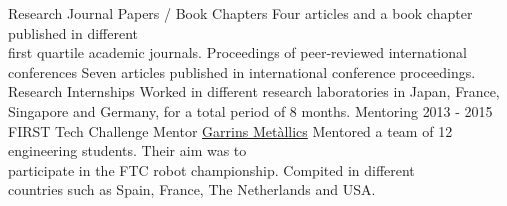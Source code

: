 \documentclass[letterpaper]{DS_class_file} %
\begin{document}
    \begin{twenty} %
        \twentyitem
        {Research}
        {}
        {Journal Papers / Book Chapters}
        {}
        {Four articles and a book chapter published in different \\ first quartile academic journals.}
        {}
        \twentyitem
        {}
        {}
        {Proceedings of peer-reviewed international conferences}
        {}
        {Seven articles published in international conference proceedings.}
        {}
        \twentyitem
        {}
        {}
        {Research Internships}
        {}
        {Worked in different research laboratories in Japan, France,\\Singapore and Germany, for a total period of 8 months.}
        {}
        \twentyitem
        {Mentoring}
        {2013 - 2015}
        {FIRST Tech Challenge Mentor}
        {\href{https://twitter.com/garrinsmetalics?lang=ca}{Garrins Met\`{a}l\cdot lics}}
        {Mentored a team of 12 engineering students. Their aim was to \\participate in the FTC robot championship. Compited in different \\countries such as Spain, France, The Netherlands and USA.}
        {}
        \\
    \end{twenty}
\end{document}
